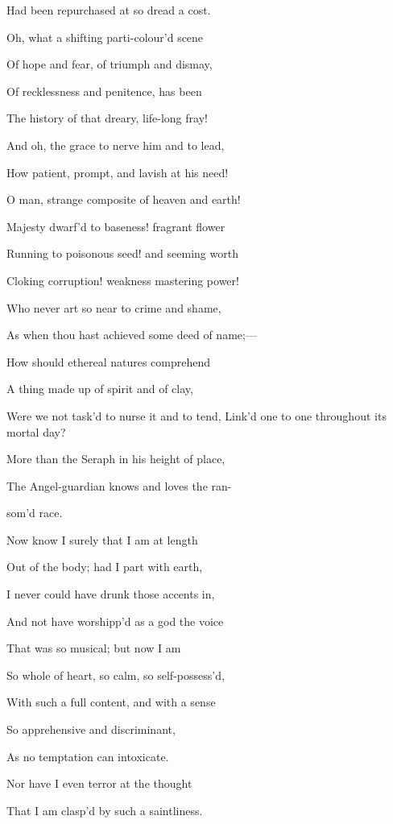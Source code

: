 Had been repurchased at so dread a cost.

Oh, what a shifting parti-colour'd scene

Of hope and fear, of triumph
and dismay,

Of recklessness and penitence, has been

The history of that dreary,
life-long fray!

And oh, the grace to nerve him and to lead,

How patient, prompt, and lavish at his need!

O man, strange composite of heaven and earth!

Majesty dwarf'd to baseness!
fragrant flower

Running to poisonous seed! and seeming worth

Cloking corruption! weakness
mastering power!

Who never art so near to crime and shame,

As when thou hast achieved some deed of name;—

How should ethereal natures comprehend

A thing made up of spirit and
of clay,

Were we not task'd to nurse it and to tend, Link'd one to one throughout
its mortal day?

More than the Seraph in his height of place,

The Angel-guardian knows and loves the ran-

som'd race.


Now know I surely that I am at length

Out of the body; had I part with earth,

I never could have drunk those accents in,

And not have worshipp'd as a god the voice

That was so musical; but now I am

So whole of heart, so calm, so self-possess'd,

With such a full content, and with a sense

So apprehensive and discriminant,

As no temptation can intoxicate.

Nor have I even terror at the thought

That I am clasp'd by such a saintliness.


